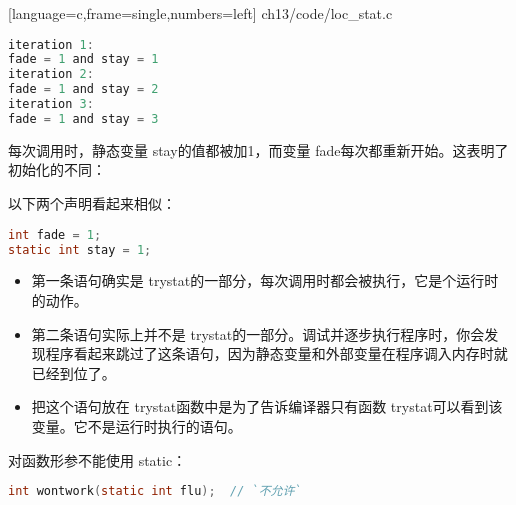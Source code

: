 \begin{frame}\ft{\subsecname}

[language=c,frame=single,numbers=left]
{ch13/code/loc_stat.c}
\end{frame}

\begin{frame}[fragile]\ft{\subsecname}
  \begin{lstlisting}[language=c,frame=single]
iteration 1: 
fade = 1 and stay = 1
iteration 2: 
fade = 1 and stay = 2
iteration 3: 
fade = 1 and stay = 3    
  \end{lstlisting}
\end{frame}

\begin{frame}[fragile]\ft{\subsecname}
每次调用时，静态变量{ stay}的值都被加1，而变量{ fade}每次都重新开始。这表明了初始化的不同：\vspace{0.1in}

\end{frame}

\begin{frame}[fragile]\ft{\subsecname}
以下两个声明看起来相似：
\begin{lstlisting}[language=c,frame=single]
int fade = 1;
static int stay = 1;  
\end{lstlisting}
\begin{itemize}
\item 第一条语句确实是{ trystat}的一部分，每次调用时都会被执行，它是个运行时的动作。\\[0.1in]
\item 第二条语句实际上并不是{ trystat}的一部分。调试并逐步执行程序时，你会发现程序看起来跳过了这条语句，因为静态变量和外部变量在程序调入内存时就已经到位了。\\[0.1in]
\item[] 把这个语句放在{ trystat}函数中是为了告诉编译器只有函数{ trystat}可以看到该变量。它不是运行时执行的语句。
\end{itemize}
\end{frame}

\begin{frame}[fragile]\ft{\subsecname}
对函数形参不能使用{ static}：
\begin{lstlisting}[language=c,frame=single]
int wontwork(static int flu);  // `不允许`
\end{lstlisting}
\end{frame}


